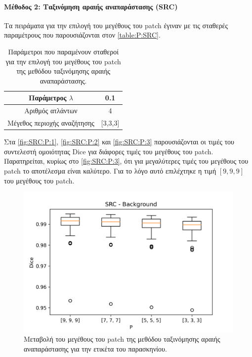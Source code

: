 \documentclass[a4paper,12pt]{article}
\newcommand{\paragraphLine}[1]{\paragraph{#1}\mbox{}}
\begin{document}
\paragraphLine{Μέθοδος 2: Ταξινόμηση αραιής αναπαράστασης (SRC)}

Τα πειράματα για την επιλογή του μεγέθους του patch έγιναν με τις σταθερές
παραμέτρους που παρουσιάζονται στον \autoref{table:P:SRC}.

\begin{table}[h!]
    \centering
    \begin{tabular}{|c|c|} 
        \hline
        Παράμετρος $\lambda$ & 0.1 \\ 
        \hline
        Αριθμός ατλάντων & 4 \\ 
        \hline
        Μέγεθος περιοχής αναζήτησης & [3,3,3] \\ 
        \hline
    \end{tabular}
    \caption{Παράμετροι που παραμένουν σταθεροί για την επιλογή του μεγέθους του
             patch της μεθόδου ταξινόμησης αραιής αναπαράστασης.}
    \label{table:P:SRC}
\end{table}

Στα \autoref{fig:SRC:P:1}, \autoref{fig:SRC:P:2} και \autoref{fig:SRC:P:3}
παρουσιάζονται οι τιμές του συντελεστή ομοιότητας Dice για διάφορες τιμές του
μεγέθους του patch. Παρατηρείται, κυρίως στο \autoref{fig:SRC:P:3}, ότι για
μεγαλύτερες τιμές του μεγέθους του patch το αποτέλεσμα είναι καλύτερο. Για το
λόγο αυτό επιλέχτηκε η τιμή $[9,9,9]$ του μεγέθους του patch.

\begin{figure}[H]
    \centering
    \includegraphics[width=0.85\linewidth]{SRC_P_Background_plot.png}
    \caption{Μεταβολή του μεγέθους του patch της μεθόδου ταξινόμησης αραιής
             αναπαράστασης για την ετικέτα του παρασκηνίου.}
    \label{fig:SRC:P:1}
\end{figure}
\end{document}
